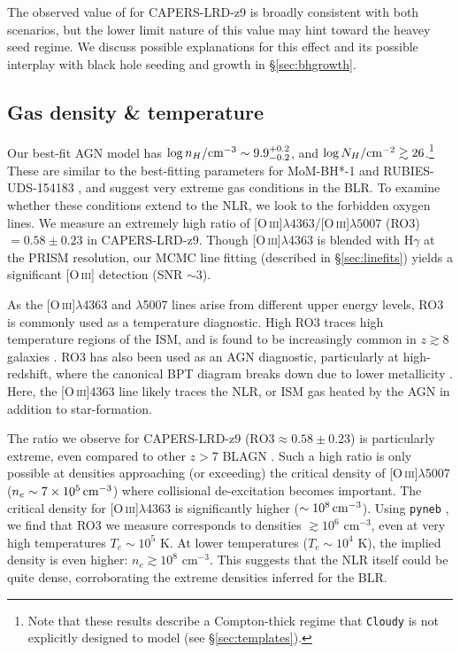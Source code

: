 \documentclass[twocolumn]{aastex7}
\newcommand{\oiii}{[O\,\textsc{iii}]}
\newcommand{\src}{CAPERS-LRD-z9}
\begin{document}
The observed value of for \src{} is broadly consistent with both scenarios, but the lower limit nature of this value may hint toward the heavey seed regime.
We discuss possible explanations for this effect and its possible interplay with black hole seeding and growth in \S\ref{sec:bhgrowth}.

\subsection{Gas density \& temperature}\label{sec:temden}

Our best-fit AGN model has $\log n_H/{\rm cm}^{-3} \sim {9.9}^{+0.2}_{-0.2}$, and $\log N_H/{\rm cm}^{-2} \gtrsim 26$.\footnote{Note that these results describe a Compton-thick regime that \texttt{Cloudy} is not explicitly designed to model (see \S\ref{sec:templates}).}
These are similar to the best-fitting parameters for MoM-BH*-1 and RUBIES-UDS-154183 \citep{naidu25, degraaff25}, and suggest very extreme gas conditions in the BLR. 
To examine whether these conditions extend to the NLR, we look to the forbidden oxygen lines. 
We measure an extremely high ratio of \oiii{}$\lambda4363$/\oiii{}$\lambda5007$ (RO3) $= 0.58\pm0.23$ in \src. 
Though \oiii{}$\lambda$4363 is blended with H$\gamma$ at the PRISM resolution, our MCMC line fitting (described in \S\ref{sec:linefits}) yields a significant \oiii{} detection (SNR $\sim 3$).

As the \oiii{}$\lambda$4363 and $\lambda$5007 lines arise from different upper energy levels, RO3 is commonly used as a temperature diagnostic. 
High RO3 traces high temperature regions of the ISM, and is found to be increasingly common in $z\gtrsim 8$ galaxies \citep{brinchmann23,katz23b,cullen25}. 
RO3 has also been used as an AGN diagnostic, particularly at high-redshift, where the canonical BPT diagram breaks down due to lower metallicity \citep{backhaus23, mazzolari24}. 
Here, the \oiii{}4363 line likely traces the NLR, or ISM gas heated by the AGN in addition to star-formation. 
 
The ratio we observe for \src{} ($\mathrm{RO3} \approx 0.58\pm0.23$) is particularly extreme, even compared to other $z>7$ BLAGN \citep{kokorev23,tripodi24,ubler24}.
Such a high ratio is only possible at densities approaching (or exceeding) the critical density of \oiii{}$\lambda$5007 ($n_e \sim 7\times 10^5\,{\rm cm}^{-3}$) where collisional de-excitation becomes important.
The critical density for \oiii{}$\lambda$4363 is significantly higher ($\sim 10^8\,{\rm cm}^{-3}$). 
Using \texttt{pyneb} \citep{luridiana15}, we find that RO3 we measure corresponds to densities $\gtrsim 10^6$ cm$^{-3}$, even at very high temperatures $T_e\sim 10^5$ K. 
At lower temperatures ($T_e \sim 10^4$ K), the implied density is even higher: $n_e\gtrsim 10^8$ cm$^{-3}$. 
This suggests that the NLR itself could be quite dense, corroborating the extreme densities inferred for the BLR. 
\end{document}
